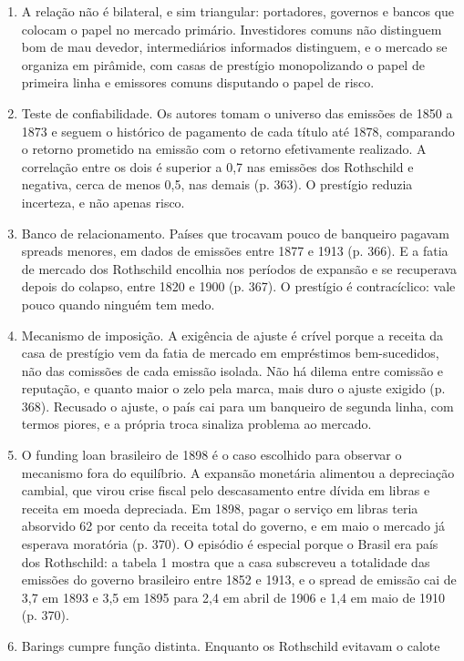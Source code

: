 \begin{enumerate}[leftmargin=*,nosep]
\item A relação não é bilateral, e sim triangular: portadores, governos e bancos
  que colocam o papel no mercado primário. Investidores comuns não distinguem
  bom de mau devedor, intermediários informados distinguem, e o mercado se
  organiza em pirâmide, com casas de prestígio monopolizando o papel de primeira
  linha e emissores comuns disputando o papel de risco.
\item Teste de confiabilidade. Os autores tomam o universo das emissões de 1850
  a 1873 e seguem o histórico de pagamento de cada título até 1878, comparando o
  retorno prometido na emissão com o retorno efetivamente realizado. A
  correlação entre os dois é superior a 0,7 nas emissões dos Rothschild e
  negativa, cerca de menos 0,5, nas demais (p. 363). O prestígio reduzia
  incerteza, e não apenas risco.
\item Banco de relacionamento. Países que trocavam pouco de banqueiro pagavam
  spreads menores, em dados de emissões entre 1877 e 1913 (p. 366). E a fatia de
  mercado dos Rothschild encolhia nos períodos de expansão e se recuperava
  depois do colapso, entre 1820 e 1900 (p. 367). O prestígio é contracíclico:
  vale pouco quando ninguém tem medo.
\item Mecanismo de imposição. A exigência de ajuste é crível porque a receita da
  casa de prestígio vem da fatia de mercado em empréstimos bem-sucedidos, não das
  comissões de cada emissão isolada. Não há dilema entre comissão e reputação, e
  quanto maior o zelo pela marca, mais duro o ajuste exigido (p. 368). Recusado o
  ajuste, o país cai para um banqueiro de segunda linha, com termos piores, e a
  própria troca sinaliza problema ao mercado.
\item O funding loan brasileiro de 1898 é o caso escolhido para observar o
  mecanismo fora do equilíbrio. A expansão monetária alimentou a depreciação
  cambial, que virou crise fiscal pelo descasamento entre dívida em libras e
  receita em moeda depreciada. Em 1898, pagar o serviço em libras teria
  absorvido 62 por cento da receita total do governo, e em maio o mercado já
  esperava moratória (p. 370). O episódio é especial porque o Brasil era país dos
  Rothschild: a tabela 1 mostra que a casa subscreveu a totalidade das emissões
  do governo brasileiro entre 1852 e 1913, e o spread de emissão cai de 3,7 em
  1893 e 3,5 em 1895 para 2,4 em abril de 1906 e 1,4 em maio de 1910 (p. 370).
\item Barings cumpre função distinta. Enquanto os Rothschild evitavam o calote

\end{enumerate}
